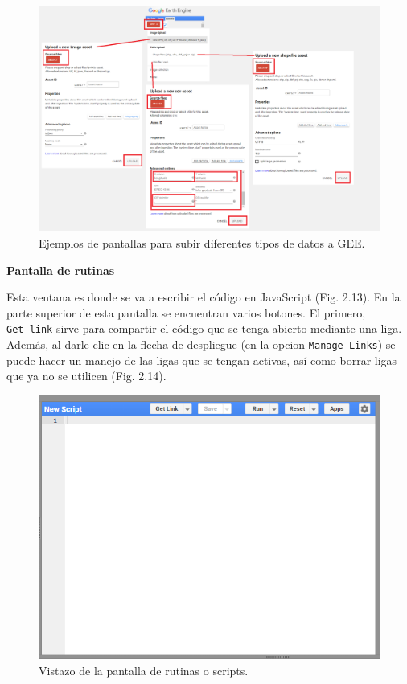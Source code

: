 \documentclass[
  12pt,
  letterpaper,
  twoside]{book}
\begin{document}
\begin{figure}[btp]

{\centering \includegraphics[width=1\linewidth]{Img/newAssets} 

}

\caption{Ejemplos de pantallas para subir diferentes tipos de datos a GEE.}\label{fig:unnamed-chunk-13}
\end{figure}

\textbf{Pantalla de rutinas}

Esta ventana es donde se va a escribir el código en JavaScript (Fig. 2.13). En la parte superior de esta pantalla se encuentran varios botones. El primero, \texttt{Get\ link} sirve para compartir el código que se tenga abierto mediante una liga. Además, al darle clic en la flecha de despliegue (en la opcion \texttt{Manage\ Links}) se puede hacer un manejo de las ligas que se tengan activas, así como borrar ligas que ya no se utilicen (Fig. 2.14).

\begin{figure}[btp]

{\centering \includegraphics[width=0.5\linewidth]{Img/editor} 

}

\caption{Vistazo de la pantalla de rutinas o scripts.}\label{fig:unnamed-chunk-14}
\end{figure}
\end{document}
